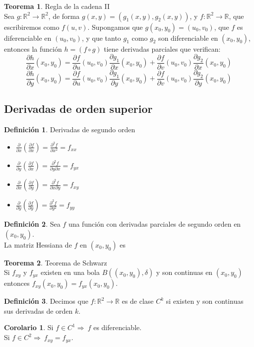 \documentclass[10pt]{article}
\theoremstyle{definition}
\newtheorem{definition}{Definición}[section]
\newtheorem{theorem}{Teorema}[section]
\newtheorem{corollary}{Corolario}[theorem]
\begin{document}
\begin{theorem}{Regla de la cadena II}
    \\Sea $g:\mathbb{R}^2\to\mathbb{R}^2$, de forma $g(x,y)=(g_1(x,y),g_2(x,y))$, y $f:\mathbb{R}^2\to\mathbb{R}$, que escribiremos como $f(u,v)$. Supongamos que $g(x_0,y_0)=(u_0,v_0)$, que $f$ es diferenciable en $(u_0,v_0)$, y que tanto $g_1$ como $g_2$ son diferenciable en $(x_0,y_0)$, entonces la función $h=(f\circ g)$ tiene derivadas parciales que verifican:$$\frac{\partial h}{\partial x}(x_0,y_0)=\frac{\partial f}{\partial u}(u_0,v_0)\frac{\partial g_1}{\partial x}(x_0,y_0)+\frac{\partial f}{\partial v}(u_0,v_0)\frac{\partial g_2}{\partial x}(x_0,y_0)$$
    $$\frac{\partial h}{\partial y}(x_0,y_0)=\frac{\partial f}{\partial u}(u_0,v_0)\frac{\partial g_1}{\partial y}(x_0,y_0)+\frac{\partial f}{\partial v}(u_0,v_0)\frac{\partial g_2}{\partial y}(x_0,y_0)$$
\end{theorem}
\newpage\subsection{Derivadas de orden superior}
\begin{definition}{Derivadas de segundo orden}
\begin{itemize}
    \item $\frac{\partial}{\partial x}(\frac{\partial f}{\partial x})=\frac{\partial^2 f}{\partial x^2}=f_{xx}$
    \item $\frac{\partial}{\partial y}(\frac{\partial f}{\partial x})=\frac{\partial^2 f}{\partial y\partial x}=f_{yx}$
    \item $\frac{\partial}{\partial x}(\frac{\partial f}{\partial y})=\frac{\partial^2 f}{\partial x\partial y}=f_{xy}$
    \item $\frac{\partial}{\partial y}(\frac{\partial f}{\partial y})=\frac{\partial^2 f}{\partial y^2}=f_{yy}$
\end{itemize}
\end{definition}
\begin{definition}
    Sea $f$ una función con derivadas parciales de segundo orden en $(x_0,y_0)$.
    \\La matriz Hessiana de $f$ en $(x_0,y_0)$ es 
\end{definition}
\begin{theorem}{Teorema de Schwarz}
    \\Si $f_{xy}$ y $f_{yx}$ existen en una bola $B((x_0,y_0),\delta)$ y son continuas en $(x_0,y_0)$ entonces $f_{xy}(x_0,y_0)=f_{yx}(x_0,y_0)$.
\end{theorem}
\begin{definition}
    Decimos que $f:\mathbb{R}^2\to\mathbb{R}$ es de clase $C^k$ si existen y son continuas sus derivadas de orden $k$.
\end{definition}
\begin{corollary}
    Si $f\in C^1\Rightarrow\ f$ es diferenciable.\\
    Si $f\in C^2\Rightarrow\ f_{xy}=f_{yx}$.
\end{corollary}
\end{document}
